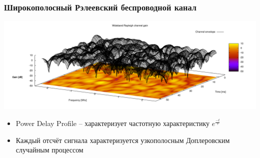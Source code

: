 \documentclass[utf8]{beamer}
\begin{document}
\begin{frame}
\frametitle{Широкополосный Рэлеевский беспроводной канал}
\centering
\includegraphics[width=1.1\textwidth]{pics/wideband-rayleigh.pdf}
\begin{itemize}
 \item Power Delay Profile -- характеризует частотную характеристику $e^{\frac{-t}{\tau}}$
 \item Каждый отсчёт сигнала характеризуется узкополосным Доплеровским случайным процессом
\end{itemize}
\end{frame}
\end{document}
